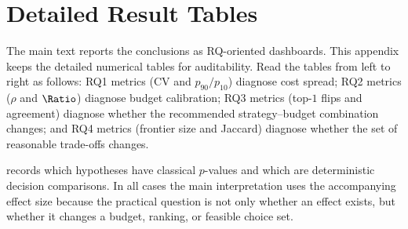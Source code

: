 \appendices

\section{Detailed Result Tables}
\label{app:detailed-results}

The main text reports the conclusions as RQ-oriented dashboards. This appendix
keeps the detailed numerical tables for auditability. Read the tables from left
to right as follows: RQ1 metrics (CV and $p_{90}/p_{10}$) diagnose cost spread;
RQ2 metrics ($\rho$ and $\Ratio$) diagnose budget calibration; RQ3 metrics
(top-$1$ flips and agreement) diagnose whether the recommended
strategy--budget combination changes;
and RQ4 metrics (frontier size and Jaccard) diagnose whether the set of
reasonable trade-offs changes.

 records which hypotheses have classical
$p$-values and which are deterministic decision comparisons. In all cases the
main interpretation uses the accompanying effect size because the practical
question is not only whether an effect exists, but whether it changes a budget,
ranking, or feasible choice set.

